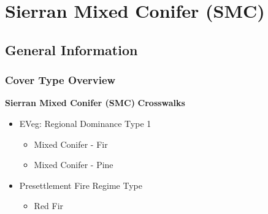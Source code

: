 \section{Sierran Mixed Conifer (SMC)}
\label{smc-description}

\subsection*{General Information}

\subsubsection{Cover Type Overview}

\textbf{Sierran Mixed Conifer (SMC)}
\newline
\textbf{Crosswalks}
\begin{itemize}
	\item EVeg: Regional Dominance Type 1
	\begin{itemize}
		\item Mixed Conifer - Fir
		\item Mixed Conifer - Pine
	\end{itemize}

	\item Presettlement Fire Regime Type
	\begin{itemize}
		\item Red Fir
	\end{itemize}
\end{itemize}



